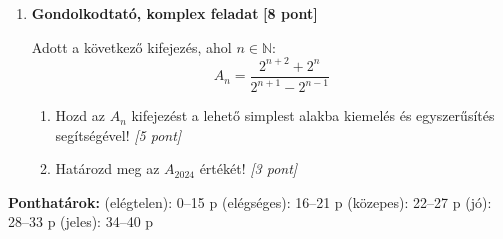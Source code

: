 \documentclass[11pt,a4paper]{article}
\begin{document}
\begin{enumerate}
    Oldód meg a következő exponenciális egyenleteket a valós számok halmazán az alapok azonosságára visszavezetve:
    \begin{enumerate}
        \item $2^{3x-1} = 32$ \hfill \textit{[4 pont]}
        \item $9^{x+1} = \dfrac{1}{27^x}$ \hfill \textit{[4 pont]}
    \end{enumerate}

    \vspace{2mm}
    \item \textbf{Gondolkodtató, komplex feladat} \hfill \textbf{[8 pont]}
    
    Adott a következő kifejezés, ahol $n \in \mathbb{N}$:
    $$A_n = \dfrac{2^{n+2} + 2^n}{2^{n+1} - 2^{n-1}}$$
    \begin{enumerate}
        \item Hozd az $A_n$ kifejezést a lehető simplest alakba kiemelés és egyszerűsítés segítségével! \hfill \textit{[5 pont]}
        \item Határozd meg az $A_{2024}$ értékét! \hfill \textit{[3 pont]}
    \end{enumerate}
\end{enumerate}

\vfill
\noindent
\begin{center}
\small
\textbf{Ponthatárok:}  (elégtelen): 0--15 p  (elégséges): 16--21 p  (közepes): 22--27 p  (jó): 28--33 p  (jeles): 34--40 p
\end{center}


\newpage
\end{document}
